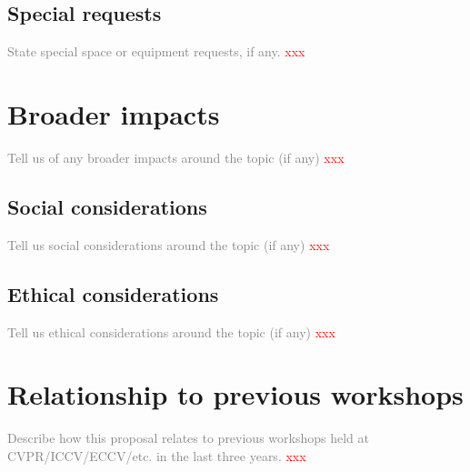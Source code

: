 \documentclass{article}
\def\c#1{\textcolor{gray}{#1}}
\def\x{\textcolor{red}{xxx}}
\begin{document}
\subsection{Special requests}
\c{State special space or equipment requests, if any.}
\x


\section{Broader impacts}
\c{Tell us of any broader impacts around the topic (if any)}
\x
\subsection{Social considerations}
\c{Tell us social considerations around the topic (if any)}
\x
\subsection{Ethical considerations}
\c{Tell us ethical considerations around the topic (if any)}
\x


\section{Relationship to previous workshops}
\c{Describe how this proposal relates to previous workshops held at CVPR/ICCV/ECCV/etc. in the last three years.}
\x
\end{document}
